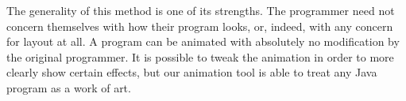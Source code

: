 \documentclass[11pt]{article}
\begin{document}
The generality of this method is one of its strengths.  The programmer need not
concern themselves with how their program looks, or, indeed, with any concern
for layout at all.  A program can be animated with absolutely no modification
by the original programmer.  It is possible to tweak the animation in order to
more clearly show certain effects, but our animation tool is able to treat any
Java program as a work of art.

\setlength{\baselineskip}{13pt} 

\end{document}

